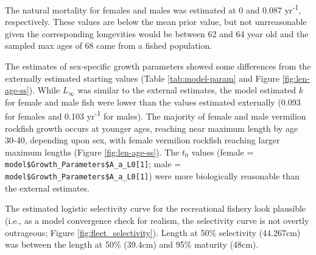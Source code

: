 \documentclass[11pt,
  english,
  a4paper,
]{article}
\begin{document}
\leavevmode\tagmcend\tagstructend\par


The natural mortality for females and males was estimated at 0 and 0.087 yr\textsuperscript{-1}, respectively. These values are below the mean prior value, but not unrreasonable given the corresponding longevities would be between 62 and 64 year old and the sampled max ages of 68 came from a fished population.

\leavevmode\tagmcend\tagstructend\par


The estimates of sex-specific growth parameters showed some differences from the externally estimated starting values (Table \ref{tab:model-param} and Figure \ref{fig:len-age-ss}). While {\(L_{\infty}\)\leavevmode\tagmcend\tagstructend} was similar to the external estimates, the model estimated {\(k\)\leavevmode\tagmcend\tagstructend} for female and male fish were lower than the values estimated externally (0.093 for females and 0.103 yr\textsuperscript{-1} for males). The majority of female and male vermilion rockfish growth occurs at younger ages, reaching near maximum length by age 30-40, depending upon sex, with female vermilion rockfish reaching larger maximum lengths (Figure \ref{fig:len-age-ss}). The {\(t_0\)\leavevmode\tagmcend\tagstructend} values (female = \texttt{model\$Growth\_Parameters\$A\_a\_L0{[}1{]}}; male = \texttt{model\$Growth\_Parameters\$A\_a\_L0{[}1{]}}) were more biologically reasonable than the external estimates.

\leavevmode\tagmcend\tagstructend\par


The estimated logistic selectivity curve for the recreational fishery look plausible (i.e., as a model convergence check for realism, the selectivity curve is not overtly outrageous; Figure \ref{fig:fleet_selectivity}). Length at 50\% selectivity (44.267cm) was between the length at 50\% (39.4cm) and 95\% maturity (48cm).

\leavevmode\tagmcend\tagstructend\par

\end{document}
